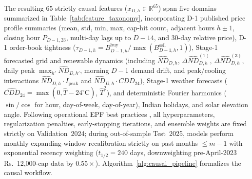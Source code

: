\documentclass[runningheads,a4paper]{llncs}
\begin{document}
The resulting 65 strictly causal features ($x_{D,h} \in \mathbb{R}^{65}$) span five domains summarized in Table~\ref{tab:feature_taxonomy}, incorporating D-1 published price profile summaries (mean, std, min, max, cap-hit count, adjacent hours $h\pm 1$, closing hour $P_{D-1,23}$, multi-day lags up to $D-14$, and 30-day relative price), D-1 order-book tightness ($\tau_{D-1,h} = B_{D-1,h}^{\text{buy}} / \max(B_{D-1,h}^{\text{sell}}, 1)$), Stage-1 forecasted grid and renewable dynamics (including $\widehat{ND}_{D,h}$, $\Delta \widehat{ND}_{D,h}^{(1)}$, $\Delta \widehat{ND}_{D,h}^{(3)}$, daily peak $\max_{h'} \widehat{ND}_{D,h'}$, morning $D-1$ demand drift, and peak/cooling interactions $\widehat{ND}_{D,h} \cdot I_{\text{peak}}$ and $\widehat{ND}_{D,h} \cdot \widehat{CDD}_{24}$), Stage-1 weather forecasts ($\widehat{CDD}_{24} = \max(0, \hat{T} - 24^\circ\text{C})$, $\hat{T}^2$), and deterministic Fourier harmonics ($\sin/\cos$ for hour, day-of-week, day-of-year), Indian holidays, and solar elevation angle. Following operational EPF best practices \cite{lago2021forecasting}, all hyperparameters, regularization penalties, early-stopping iterations, and ensemble weights are fixed strictly on Validation~2024; during out-of-sample Test~2025, models perform monthly expanding-window recalibration strictly on past months $\le m-1$ with exponential recency weighting ($t_{1/2} = 240$ days, downweighting pre-April-2023 Rs.~12,000-cap data by $0.55\times$). Algorithm~\ref{alg:causal_pipeline} formalizes the causal workflow.
\end{document}
